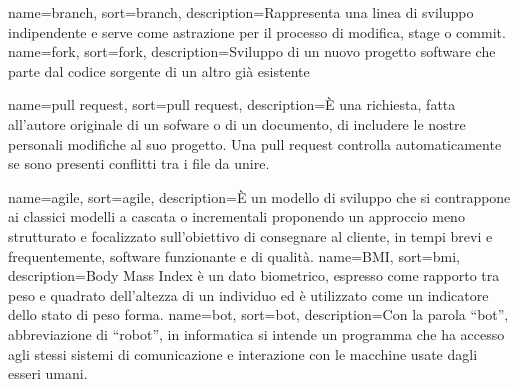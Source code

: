 
\renewcommand{\acronymname}{Acronimi e abbreviazioni}




\renewcommand{\glsnamefont}[1]{\makefirstuc{#1}}


{
    name=branch,
    sort=branch,
    description={Rappresenta una linea di sviluppo indipendente e serve come astrazione per il processo di modifica,
stage o commit.}
}
{
    name=fork,
    sort=fork,
    description={Sviluppo di un nuovo progetto software che parte dal codice sorgente di un altro già esistente}
}

{
    name=pull request,
    sort=pull request,
    description={È una richiesta, fatta all’autore originale di un sofware o di un documento, di includere le nostre personali modifiche al suo progetto. Una pull request controlla automaticamente se sono presenti conflitti tra i file da unire.}
}

{
    name=agile,
    sort=agile,
    description={È un modello di sviluppo che si contrappone ai classici modelli a cascata o incrementali proponendo un approccio meno strutturato e focalizzato sull'obiettivo di consegnare al cliente, in tempi brevi e frequentemente, software funzionante e di qualità. }
}
{
    name=BMI,
    sort=bmi,
    description={Body Mass Index è un dato biometrico, espresso come rapporto tra peso e quadrato dell'altezza di un individuo ed è utilizzato come un indicatore dello stato di peso forma. }
}
{
    name=bot,
    sort=bot,
    description={Con la parola “bot”, abbreviazione di “robot”, in informatica si intende un programma che ha accesso agli stessi sistemi di comunicazione e interazione con le macchine usate dagli esseri umani.}
}

